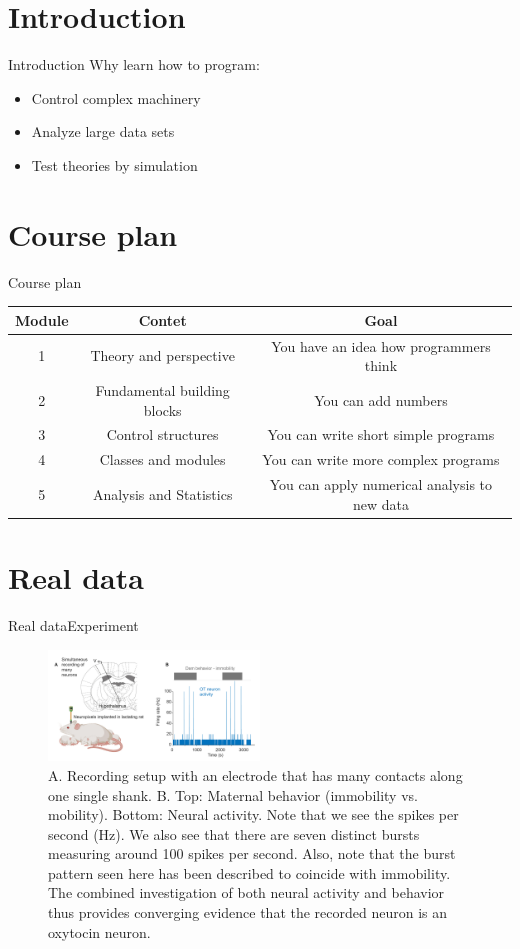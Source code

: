 \documentclass[aspectratio=169]{beamer}
\begin{document}
\section{Introduction}
\begin{frame}{Introduction}
Why learn how to program:
\begin{itemize}
	\item Control complex machinery
	\item Analyze large data sets
	\item Test theories by simulation
\end{itemize}
\end{frame}

\section{Course plan}
\begin{frame}{Course plan}
\begin{tabular}{ccc}
	\toprule
	Module & Contet & Goal \\
	\midrule
	1 & Theory and perspective & You have an idea how programmers think \\
	2 & Fundamental building blocks & You can add numbers \\
	3 & Control structures & You can write short simple programs \\
	4 & Classes and modules & You can write more complex programs \\
	5 & Analysis and Statistics & You can apply numerical analysis to new data \\
\end{tabular}
\end{frame}

\section{Real data}
\begin{frame}{Real data}{Experiment}
\begin{figure}[h]
\centering
\includegraphics[width=0.5\textwidth]{../img/experiment.jpg}
\caption{
	A. Recording setup with an electrode that has many contacts along one single shank.
	B. Top: Maternal behavior (immobility vs. mobility).
	Bottom: Neural activity. Note that we see the spikes per second (Hz). 
	We also see that there are seven distinct bursts measuring around 100 spikes per second.
	Also, note that the burst pattern seen here has been described to coincide with immobility.
	The combined investigation of both neural activity and behavior thus provides converging evidence
	that the recorded neuron is an oxytocin neuron.
}
\end{figure}
\end{frame}
\end{document}

